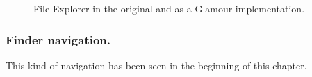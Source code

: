 \documentclass[a4paper,10pt,twoside]{book}
\begin{document}
\begin{figure}[tbp]
\begin{center}
\caption{File Explorer in the original and as a Glamour implementation.}
\label{fig:casestudies/file_explorer}
\end{center}
\end{figure}

\subsubsection{Finder navigation.} This kind of navigation has been
seen in the beginning of this chapter.
\end{document}
